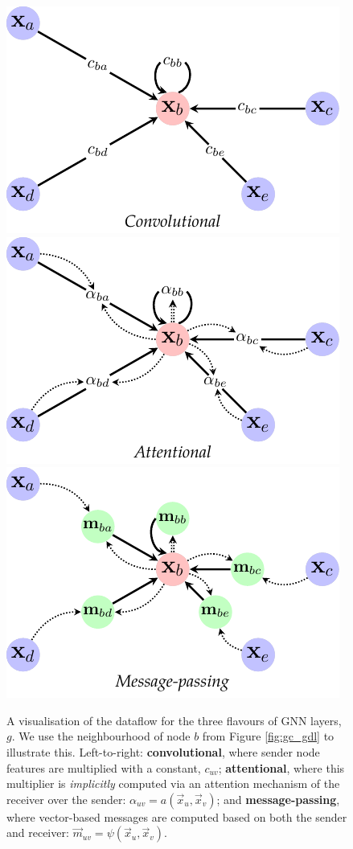 \begin{figure}
    \centering
    \includegraphics[width=0.33\linewidth]{figures/GNN_GDL_TYPES_C.pdf}
    \hspace{-0.5em}
    \includegraphics[width=0.33\linewidth]{figures/GNN_GDL_TYPES_A.pdf}
    \hspace{-0.5em}
    \includegraphics[width=0.33\linewidth]{figures/GNN_GDL_TYPES_MP.pdf}
    \caption{A visualisation of the dataflow for the three flavours of GNN layers, $g$. We use the neighbourhood of node $b$ from Figure \ref{fig:gc_gdl} to illustrate this. Left-to-right: \textbf{convolutional}, where sender node features are multiplied with a constant, $c_{uv}$; \textbf{attentional}, where this multiplier is \emph{implicitly} computed via an attention mechanism of the receiver over the sender: $\alpha_{uv}=a(\vec{x}_u, \vec{x}_v)$; and \textbf{message-passing}, where vector-based messages are computed based on both the sender and receiver: $\vec{m}_{uv}=\psi(\vec{x}_u, \vec{x}_v)$.}
    \label{fig:gc_flavours}
\end{figure}%




